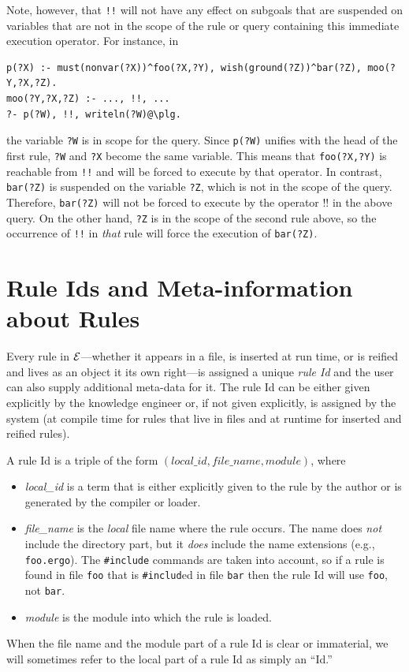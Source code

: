 \documentclass[11pt]{article}
\newcommand{\ERGO}{\mbox{\ensuremath{\cal{E}}\smaller{{\sc{RGO}}}}\xspace}
\newcommand{\FLSYSTEM}{\ERGO}
\newcommand{\ergoext}{ergo\xspace}
\begin{document}
Note, however, that \texttt{!!} will not have any effect on subgoals that
are suspended on variables that are not in the scope of the rule or query
containing this
immediate execution operator. For instance, in
\begin{verbatim}
p(?X) :- must(nonvar(?X))^foo(?X,?Y), wish(ground(?Z))^bar(?Z), moo(?Y,?X,?Z).
moo(?Y,?X,?Z) :- ..., !!, ...
?- p(?W), !!, writeln(?W)@\plg.
\end{verbatim}
the variable \texttt{?W} is in scope for the query. Since
\texttt{p(?W)} unifies with the head of the first rule, \texttt{?W} and
\texttt{?X} become the same variable. This means that \texttt{foo(?X,?Y)}
is reachable from \texttt{!!} and will be forced to execute by that operator.
In contrast, \texttt{bar(?Z)} is suspended on the variable \texttt{?Z},
which is not in the scope of the query. Therefore, \texttt{bar(?Z)} will
not be forced to execute by the operator !! in the above query.   
On the other hand, \texttt{?Z} is in the scope of the second rule above, so
the occurrence of \texttt{!!} in \emph{that} rule will force the execution of
\texttt{bar(?Z)}.   


\section{Rule Ids and Meta-information about Rules}
\label{sec-rule-id}

Every rule in \FLSYSTEM---whether it appears in a file, is inserted at run
time, or is reified and lives as an object it its own right---is assigned a
unique \emph{rule Id} and the user can also supply additional
meta-data for it. The rule Id can be either given explicitly by the
knowledge engineer or, if not given explicitly, is assigned by the system (at compile time for
rules that live in files and at runtime for inserted and reified rules).

\noindent
A rule Id is a triple of the form
$(local\_id,file\_name,module)$, where
\begin{itemize}
\item \emph{local\_id} is a term that is either explicitly given to the rule
  by the author or is generated by the compiler or loader.
\item \emph{file\_name} is the \emph{local}
  file name where the rule occurs. The name
  does \emph{not} include the directory part, but it \emph{does}
  include the name
  extensions (e.g., \texttt{foo.\ergoext}). The \texttt{\#include} commands are
  taken into account, so if a rule is found in file \texttt{foo} that is
  \texttt{\#includ}ed in file \texttt{bar} then the rule Id will use
  \texttt{foo}, not \texttt{bar}.
\item \emph{module} is the module into which the rule is loaded. 
\end{itemize}
When the file name and the module part of a rule Id is clear or immaterial,
we will sometimes refer to the local part of a rule Id as simply an ``Id.''
\end{document}
